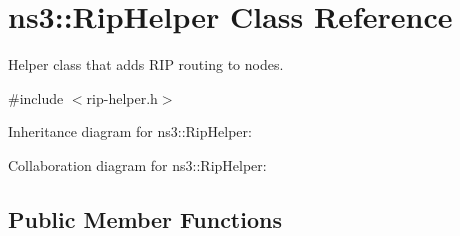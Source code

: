 \hypertarget{classns3_1_1RipHelper}{}\section{ns3\+:\+:Rip\+Helper Class Reference}
\label{classns3_1_1RipHelper}


Helper class that adds R\+IP routing to nodes.  




{\ttfamily \#include $<$rip-\/helper.\+h$>$}



Inheritance diagram for ns3\+:\+:Rip\+Helper\+:


Collaboration diagram for ns3\+:\+:Rip\+Helper\+:
\subsection*{Public Member Functions}
